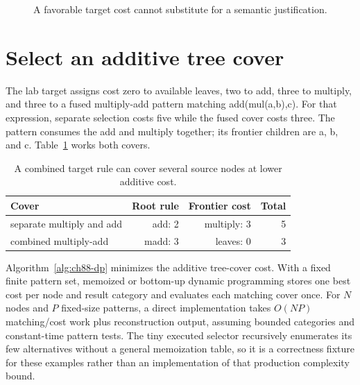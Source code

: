 \begin{figure}[htbp]
\centering
{}
\caption{A favorable target cost cannot substitute for a semantic justification.}
\label{fig:ch88-pipeline}
\end{figure}

\section{Select an additive tree cover}
\label{sec:ch88-select}
The lab target assigns cost zero to available leaves, two to add, three to multiply, and three to a fused multiply-add pattern matching add(mul(a,b),c).
For that expression, separate selection costs five while the fused cover costs three.
The pattern consumes the add and multiply together; its frontier children are a, b, and c.
Table~\ref{tab:ch88-costs} works both covers.

\begin{table}[htbp]
\caption{A combined target rule can cover several source nodes at lower additive cost.}
\label{tab:ch88-costs}
\centering
\begin{tabular}{lrrr}
\toprule
Cover & Root rule & Frontier cost & Total \\
\midrule
separate multiply and add & add: 2 & multiply: 3 & 5 \\
combined multiply-add & madd: 3 & leaves: 0 & 3 \\
\bottomrule
\end{tabular}
\end{table}

Algorithm~\ref{alg:ch88-dp} minimizes the additive tree-cover cost.
With a fixed finite pattern set, memoized or bottom-up dynamic programming stores one best cost per node and result category and evaluates each matching cover once.
For $N$ nodes and $P$ fixed-size patterns, a direct implementation takes $O(NP)$ matching/cost work plus reconstruction output, assuming bounded categories and constant-time pattern tests.
The tiny executed selector recursively enumerates its few alternatives without a general memoization table, so it is a correctness fixture for these examples rather than an implementation of that production complexity bound.

